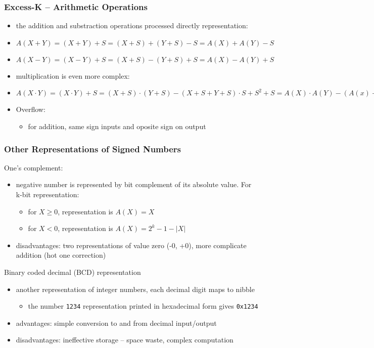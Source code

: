 \documentclass{beamer}
\begin{document}
\begin{frame}
\frametitle{Excess-K -- Arithmetic Operations}

\begin{itemize}
\item the addition and substraction operations processed directly representation:
\item $A ( X + Y )=( X + Y )+S =( X + S )+(Y + S ) - S = A ( X )+ A (Y ) -S$
\item $A ( X - Y )=( X - Y )+ S =( X + S ) - (Y +S )+S = A ( X ) - A (Y )+S$
\item multiplication is even more complex:
\item $A ( X \cdot Y )=( X \cdot Y )+S =( X + S )\cdot(Y + S )-( X + S +Y +S )\cdot S + S^2+ S
= A ( X )\cdot A (Y ) - ( A ( x)+ A ( y ))\cdot S + S^2 +S$
\end{itemize}
\bigskip
\begin{itemize}
\item Overflow:
\begin{itemize}
\item for addition, same sign inputs and oposite sign on output
\end{itemize}
\end{itemize}
\end{frame}


\begin{frame}
\frametitle{Other Representations of Signed Numbers}

One's complement:
\begin{itemize}
\item negative number is represented by bit complement of its absolute value. For k-bit representation:
\begin{itemize}
\item for $X\ge0$, representation is $A(X) = X$
\item for $X<0$, representation is $A(X) = 2^k-1-|X|$
\end{itemize}
\item disadvantages: two representations of value zero (-0, +0), more complicate addition (hot one correction)
\end{itemize}
\bigskip
Binary coded decimal (BCD) representation
\begin{itemize}
\item another representation of integer numbers, each decimal digit maps to nibble 
\begin{itemize}
\item the number \texttt{1234} representation printed in hexadecimal form gives \texttt{0x1234}
\end{itemize}
\item advantages: simple conversion to and from decimal input/output
\item disadvantages: ineffective storage -- space waste, complex computation
\end{itemize}
\end{frame}
\end{document}
